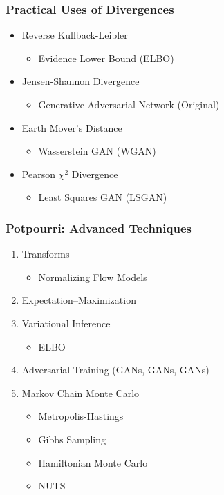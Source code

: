 \documentclass{beamer}
\begin{document}
\begin{frame}
  \frametitle{Practical Uses of Divergences}
  \begin{itemize}
    \item Reverse Kullback-Leibler
      \begin{itemize}
        \item Evidence Lower Bound (ELBO)
      \end{itemize}
    \item Jensen-Shannon Divergence
      \begin{itemize}
        \item Generative Adversarial Network (Original)
      \end{itemize}
    \item Earth Mover's Distance
      \begin{itemize}
        \item Wasserstein GAN (WGAN)
      \end{itemize}
    \item Pearson $\chi^2$ Divergence
      \begin{itemize}
        \item Least Squares GAN (LSGAN)
      \end{itemize}
  \end{itemize}
\end{frame}


\begin{frame}
  \frametitle{Potpourri: Advanced Techniques}
  \begin{enumerate}
    \item Transforms
      \begin{itemize}
        \item Normalizing Flow Models
      \end{itemize}
    \item Expectation–Maximization
    \item Variational Inference
      \begin{itemize}
        \item ELBO
      \end{itemize}
    \item Adversarial Training (GANs, GANs, GANs)
    \item Markov Chain Monte Carlo
    \begin{itemize}
      \item Metropolis-Hastings
      \item Gibbs Sampling
      \item Hamiltonian Monte Carlo
      \item NUTS
    \end{itemize}
  \end{enumerate}
\end{frame}
\end{document}

